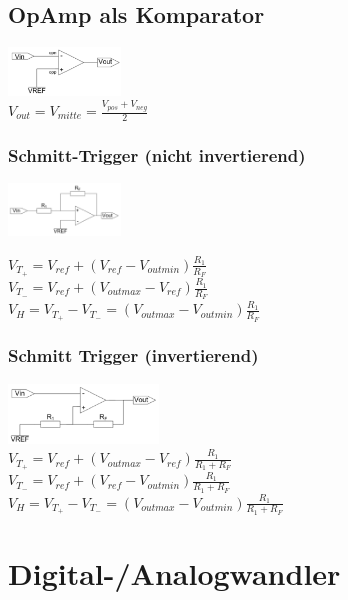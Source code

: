 \documentclass[margin=normal]{tex/hsrzf}
\begin{document}
\begin{multicols}{2}
  \subsection{OpAmp als Komparator}
  \includegraphics[width=3cm]{img/OpAmp/Komparator.png}\\
  $V_{out} = V_{mitte} = \frac{V_{pos} + V_{neg}}{2}$
  \subsubsection*{Schmitt-Trigger (nicht invertierend)}

  \includegraphics[width=3cm]{img/OpAmp/Schmitt-Trigger_nicht_invertierend.png}


  $V_{T_+} = V_{ref} + (V_{ref} - V_{out min})\frac{R_1}{R_F} $ \\
  $V_{T_-} = V_{ref} + (V_{out max} - V_{ref})\frac{R_1}{R_F} $\\
  $V_H = V_{T_+} - V_{T_-} = (V_{outmax} - V_{outmin})\frac{R_1}{R_F}$

  \subsubsection*{Schmitt Trigger (invertierend)}
  \includegraphics[width=4cm]{img/OpAmp/Schmitt-Trigger_invertierend.png}\\
  $V_{T_+} = V_{ref} + (V_{out max} - V_{ref})\frac{R_1}{R_1 + R_F} $ \\
  $V_{T_-} = V_{ref} + (V_{ref} - V_{out min})\frac{R_1}{R_1 + R_F} $\\
  $V_H = V_{T_+} - V_{T_-} = (V_{outmax} - V_{outmin})\frac{R_1}{R_1+R_F}$
\end{multicols}
\newpage
\section{Digital-/Analogwandler}
\end{document}
